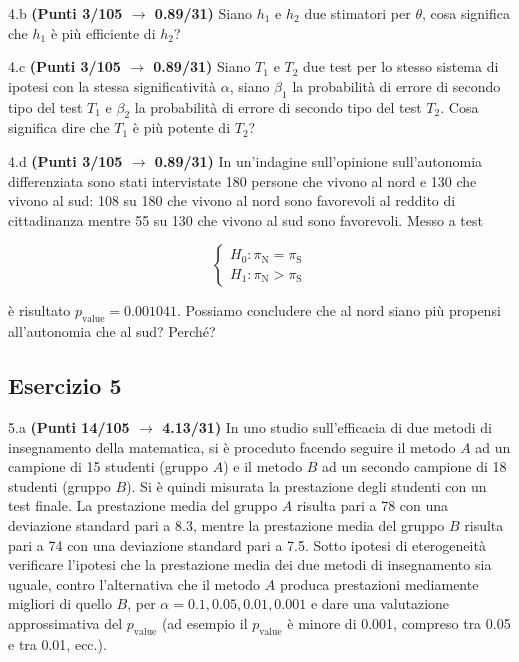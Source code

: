 \documentclass[
  11pt,
]{book}
\theoremstyle{mytheoremstyle}
\theoremstyle{mydefstyle}
\begin{document}
4.b \textbf{(Punti 3/105 \(\rightarrow\) 0.89/31)} Siano \(h_1\) e \(h_2\) due stimatori per \(\theta\), cosa significa che \(h_1\) è più efficiente di \(h_2\)?

4.c \textbf{(Punti 3/105 \(\rightarrow\) 0.89/31)} Siano \(T_1\) e \(T_2\) due test per lo stesso sistema di ipotesi con la stessa significatività \(\alpha\), siano \(\beta_1\) la probabilità di errore di secondo tipo del test \(T_1\) e \(\beta_2\) la probabilità di errore di secondo tipo del test \(T_2\). Cosa significa dire che \(T_1\) è più potente di \(T_2\)?

4.d \textbf{(Punti 3/105 \(\rightarrow\) 0.89/31)} In un'indagine sull'opinione sull'autonomia differenziata sono stati intervistate 180 persone che vivono al nord e 130 che vivono al sud: 108 su 180 che vivono al nord sono favorevoli al reddito di cittadinanza mentre 55 su 130 che vivono al sud sono favorevoli.
Messo a test

\[
\begin{cases}
   H_0: \pi_\text{N} = \pi_\text{S} \\
   H_1: \pi_\text{N} > \pi_\text{S} 
\end{cases}
\]

è risultato \(p_{\text{value}} =0.001041\). Possiamo concludere che al nord siano più propensi all'autonomia che al sud? Perché?

\subsection{Esercizio 5}\label{esercizio-5-39}

5.a \textbf{(Punti 14/105 \(\rightarrow\) 4.13/31)} In uno studio sull'efficacia di due metodi di insegnamento della matematica, si è proceduto facendo seguire il metodo \(A\) ad un campione di 15 studenti (gruppo \(A\)) e il metodo \(B\) ad un secondo campione di 18 studenti (gruppo \(B\)). Si è quindi misurata la prestazione degli studenti con un test finale. La prestazione media del gruppo \(A\) risulta pari a 78 con una deviazione standard pari a 8.3, mentre la prestazione media del gruppo \(B\) risulta pari a 74 con una deviazione standard pari a 7.5. Sotto ipotesi di eterogeneità verificare l'ipotesi che la prestazione media dei due metodi di insegnamento sia uguale, contro l'alternativa che il metodo \(A\) produca prestazioni mediamente migliori di quello \(B\), per \(\alpha=0.1,0.05,0.01,0.001\) e dare una valutazione approssimativa del \(p_\text{value}\) (ad esempio il \(p_\text{value}\) è minore di 0.001, compreso tra 0.05 e tra 0.01, ecc.).
\end{document}
